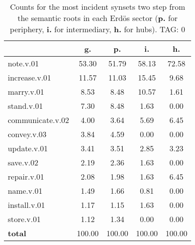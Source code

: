 \begin{table}[h!]
\begin{center}
\begin{tabular}{| l | c | c | c | c |}\hline
 & g. & p. & i. & h. \\\hline
note.v.01 & 53.30  & 51.79  & 58.13  & 72.58 \\\hline
increase.v.01 & 11.57  & 11.03  & 15.45  & 9.68 \\\hline
marry.v.01 & 8.53  & 8.48  & 10.57  & 1.61 \\\hline
stand.v.01 & 7.30  & 8.48  & 1.63  & 0.00 \\\hline
communicate.v.02 & 4.00  & 3.64  & 5.69  & 6.45 \\\hline
convey.v.03 & 3.84  & 4.59  & 0.00  & 0.00 \\\hline
update.v.01 & 3.41  & 3.51  & 2.85  & 3.23 \\\hline
save.v.02 & 2.19  & 2.36  & 1.63  & 0.00 \\\hline
repair.v.01 & 2.08  & 1.98  & 1.63  & 6.45 \\\hline
name.v.01 & 1.49  & 1.66  & 0.81  & 0.00 \\\hline
install.v.01 & 1.17  & 1.15  & 1.63  & 0.00 \\\hline
store.v.01 & 1.12  & 1.34  & 0.00  & 0.00 \\\hline
{{\bf total}} & 100.00  & 100.00  & 100.00  & 100.00 \\\hline
\end{tabular}
\caption{Counts for the most incident synsets two step from the semantic roots in each Erd\"os sector ({\bf p.} for periphery, {\bf i.} for intermediary, {\bf h.} for hubs). TAG: 0}
\end{center}
\end{table}